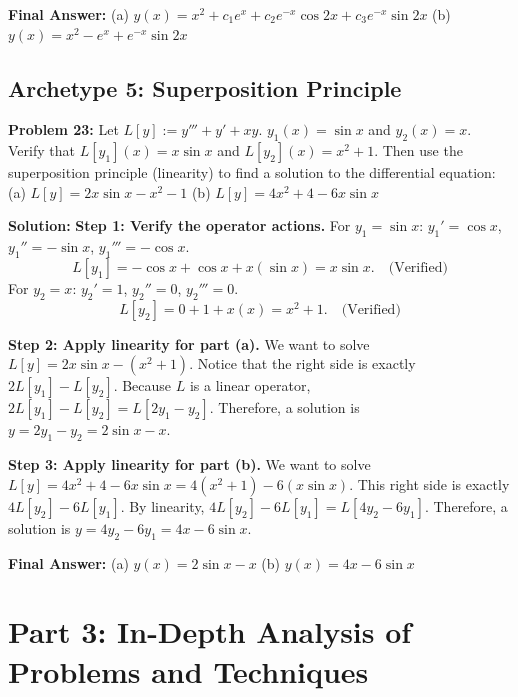 \documentclass[11pt,letterpaper]{article}
\begin{document}
\textbf{Final Answer:} 
(a) $y(x) = x^2 + c_1 e^x + c_2 e^{-x}\cos 2x + c_3 e^{-x}\sin 2x$
(b) $y(x) = x^2 - e^x + e^{-x}\sin 2x$

\subsection{Archetype 5: Superposition Principle}

\textbf{Problem 23:} Let $L[y] := y''' + y' + xy$. $y_1(x) = \sin x$ and $y_2(x) = x$. Verify that $L[y_1](x) = x \sin x$ and $L[y_2](x) = x^2 + 1$. Then use the superposition principle (linearity) to find a solution to the differential equation:
(a) $L[y] = 2x \sin x - x^2 - 1$
(b) $L[y] = 4x^2 + 4 - 6x \sin x$

\textbf{Solution:}
\textbf{Step 1: Verify the operator actions.}
For $y_1 = \sin x$: $y_1' = \cos x$, $y_1'' = -\sin x$, $y_1''' = -\cos x$.
\[ L[y_1] = -\cos x + \cos x + x(\sin x) = x \sin x. \quad \text{(Verified)} \]
For $y_2 = x$: $y_2' = 1$, $y_2'' = 0$, $y_2''' = 0$.
\[ L[y_2] = 0 + 1 + x(x) = x^2 + 1. \quad \text{(Verified)} \]

\textbf{Step 2: Apply linearity for part (a).}
We want to solve $L[y] = 2x \sin x - (x^2 + 1)$.
Notice that the right side is exactly $2L[y_1] - L[y_2]$.
Because $L$ is a linear operator, $2L[y_1] - L[y_2] = L[2y_1 - y_2]$.
Therefore, a solution is $y = 2y_1 - y_2 = 2\sin x - x$.

\textbf{Step 3: Apply linearity for part (b).}
We want to solve $L[y] = 4x^2 + 4 - 6x \sin x = 4(x^2 + 1) - 6(x \sin x)$.
This right side is exactly $4L[y_2] - 6L[y_1]$.
By linearity, $4L[y_2] - 6L[y_1] = L[4y_2 - 6y_1]$.
Therefore, a solution is $y = 4y_2 - 6y_1 = 4x - 6\sin x$.

\textbf{Final Answer:} 
(a) $y(x) = 2\sin x - x$
(b) $y(x) = 4x - 6\sin x$

\newpage
\section{Part 3: In-Depth Analysis of Problems and Techniques}
\end{document}
